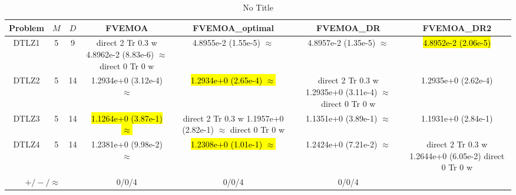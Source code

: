 \documentclass[journal]{IEEEtran}
\newcommand{\semitextbf}[1]{%
\pdfliteral direct {2 Tr 0.3 w} %
#1%
\pdfliteral direct {0 Tr 0 w}%
}
\begin{document}
\begin{table*}[htbp]
\renewcommand{\arraystretch}{1.2}
\centering
\caption{No Title}
\begin{tabular}{ccccccc}
\toprule
Problem&$M$&$D$&FVEMOA&FVEMOA\_optimal&FVEMOA\_DR&FVEMOA\_DR2\\
\midrule
\multirow{1}{*}{DTLZ1}&5&9&\semitextbf{4.8962e-2 (8.83e-6) $\approx$}&4.8955e-2 (1.55e-5) $\approx$&4.8957e-2 (1.35e-5) $\approx$&\hl{4.8952e-2 (2.06e-5)}\\
\hline
\multirow{1}{*}{DTLZ2}&5&14&1.2934e+0 (3.12e-4) $\approx$&\hl{1.2934e+0 (2.65e-4) $\approx$}&\semitextbf{1.2935e+0 (3.11e-4) $\approx$}&1.2935e+0 (2.62e-4)\\
\hline
\multirow{1}{*}{DTLZ3}&5&14&\hl{1.1264e+0 (3.87e-1) $\approx$}&\semitextbf{1.1957e+0 (2.82e-1) $\approx$}&1.1351e+0 (3.89e-1) $\approx$&1.1931e+0 (2.84e-1)\\
\hline
\multirow{1}{*}{DTLZ4}&5&14&1.2381e+0 (9.98e-2) $\approx$&\hl{1.2308e+0 (1.01e-1) $\approx$}&1.2424e+0 (7.21e-2) $\approx$&\semitextbf{1.2644e+0 (6.05e-2)}\\
\hline
\multicolumn{3}{c}{$+/-/\approx$}&0/0/4&0/0/4&0/0/4&\\
\bottomrule
\end{tabular}
\label{No Label}
\end{table*}
\end{document}
